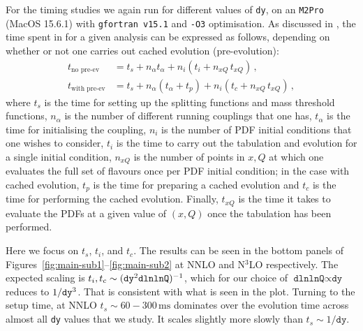 
For the timing studies we again run \hoppet{} for different values of
\texttt{dy}, on an \texttt{M2Pro} (MacOS 15.6.1) with \texttt{gfortran v15.1} and
\texttt{-O3} optimisation.
%
As discussed in \cite{Salam:2008qg}, the time spent in \hoppet for a
given analysis can be expressed as follows, depending on whether or
not one carries out cached evolution (pre-evolution):
\begin{subequations}
  \label{eq:timing-v2}
  \begin{align}
    t_\text{no pre-ev}   &= t_s + n_\alpha t_\alpha + n_i (t_i  + n_{xQ}\, t_{xQ})\,,\\
    t_\text{with pre-ev} &= t_s + n_\alpha (t_\alpha + t_p) + n_i (t_c + n_{xQ}\,
    t_{xQ})\,,
  \end{align}
\end{subequations}
where $t_s$ is the time for setting up the splitting functions and
mass threshold functions, $n_\alpha$ is the number of different
running couplings that one has, $t_\alpha$ is the time for
initialising the coupling,
%
$n_i$ is the number of PDF initial conditions that one wishes to
consider, $t_i$ is the time to carry out the tabulation and evolution
for a single initial condition, $n_{xQ}$ is the number of points in
$x,Q$ at which one evaluates the full set of flavours once per PDF
initial condition; in the case with cached evolution, $t_p$ is the
time for preparing a cached evolution and $t_c$ is the time for
performing the cached evolution. Finally, $t_{xQ}$ is the time it takes
to evaluate the PDFs at a given value of $(x,Q)$ once the tabulation
has been performed.

Here we focus on $t_s$, $t_i$, and $t_c$. The results can be seen in the
bottom panels of Figures~\ref{fig:main-sub1}--\ref{fig:main-sub2} at NNLO and
N$^3$LO respectively.
%
The expected scaling is
$t_i, t_c \sim (\text{\texttt{dy}}^2 \text{\texttt{dlnlnQ}})^{-1}$, which for our
choice of $\texttt{dlnlnQ} \propto\texttt{dy}$ reduces to
$1/\text{\texttt{dy}}^3$.
%
That is consistent with what is seen in the plot.
%
Turning to the setup time, at NNLO 
$t_s \sim 60-300\,\mathrm{ms}$ dominates over the evolution time across
almost all \texttt{dy} values that we study.
%
It scales slightly more slowly than $t_s \sim 1/\texttt{dy}$.

